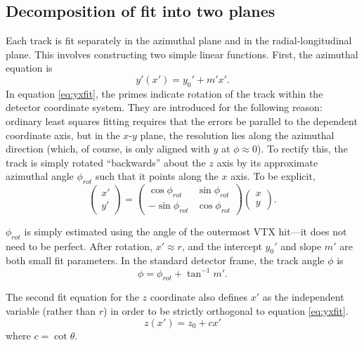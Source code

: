 \documentclass[12pt]{article}
\begin{document}
\subsection{Decomposition of fit into two planes} \label{sec:fitdecomp}
Each track is fit separately in the azimuthal plane and in the radial-longitudinal plane. This involves constructing two simple linear functions. First, the azimuthal equation is
\begin{equation} \label{eq:yxfit}
y'(x') = y_0' + m' x'.
\end{equation}
In equation \ref{eq:yxfit}, the primes indicate rotation of the track within the detector coordinate system. They are introduced for the following reason: ordinary least squares fitting requires that the errors be parallel to the dependent coordinate axis, but in the $x$-$y$ plane, the resolution lies along the azimuthal direction (which, of course, is only aligned with $y$ at $\phi \approx 0$). To rectify this, the track is simply rotated ``backwards'' about the $z$ axis by its approximate azimuthal angle $\phi_{rot}$ such that it points along the $x$ axis. To be explicit,
\begin{equation} \label{eq:phirot}
\begin{pmatrix}
x'\\
y'
\end{pmatrix}
=
\begin{pmatrix}
\cos \phi_{rot} & \sin \phi_{rot}\\
-\sin \phi_{rot} &  \cos \phi_{rot}
\end{pmatrix}
\begin{pmatrix}
x\\
y
\end{pmatrix}.
\end{equation}

$\phi_{rot}$ is simply estimated using the angle of the outermost VTX hit---it does not need to be perfect. After rotation, $x' \approx r$, and the intercept $y_0'$ and slope $m'$ are both small fit parameters. In the standard detector frame, the track angle $\phi$ is
\begin{equation}
\phi = \phi_{rot} + \tan^{-1} m'.
\end{equation}

The second fit equation for the $z$ coordinate also defines $x'$ as the independent variable (rather than $r$) in order to be strictly orthogonal to equation \ref{eq:yxfit}.
\begin{equation} \label{eq:zrfit}
z(x') = z_0 + c x'
\end{equation}
where $c = \cot \theta$.
\end{document}
